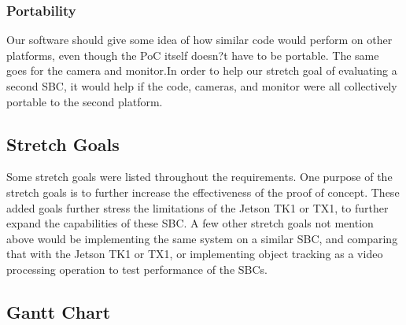 \subsubsection{Portability}
Our software should give some idea of how similar code would perform on other platforms, even though the PoC itself doesn?t have to be portable. The same goes for the camera and monitor.In order to help our stretch goal of evaluating a second SBC, it would help if the code, cameras, and monitor were all collectively portable to the second platform.\\

\subsection{Stretch Goals}
Some stretch goals were listed throughout the requirements. One purpose of the stretch goals is to further increase the effectiveness of the proof of concept. These added goals further stress the limitations of the Jetson TK1 or TX1, to further expand the capabilities of these SBC. A few other stretch goals not mention above would be implementing the same system on a similar SBC, and comparing that with the Jetson TK1 or TX1, or implementing object tracking as a video processing operation to test performance of the SBCs.\\

\subsection{Gantt Chart}


